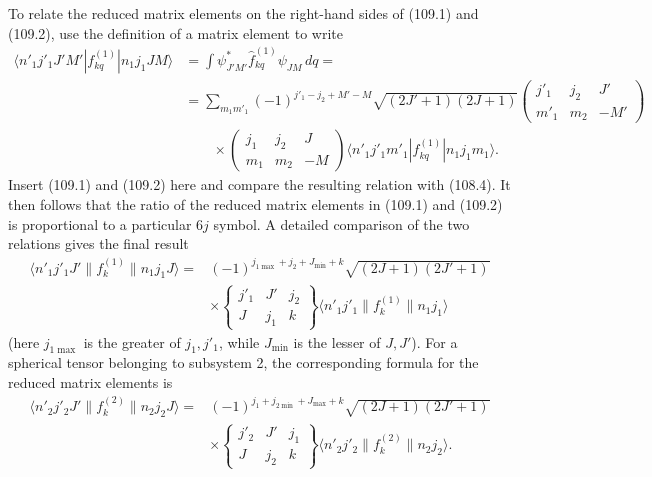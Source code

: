 To relate the reduced matrix elements on the right-hand sides of (109.1) and (109.2), use the definition of a matrix element to write
\[
 \begin{aligned}
 \langle n'_1j'_1J'M'|f_{kq}^{(1)}|n_1j_1JM\rangle
 & =\int\psi_{J'M'}^{*}\widehat f_{kq}^{(1)}\psi_{JM}\,dq={}\\
 & =\sum_{\!m_1m'_1}(-1)^{j'_1-j_2+M'-M}\!\!\!\sqrt{(2J'+1)(2J+1)}
 \begin{pmatrix}j'_1&j_2&J'\\m'_1&m_2&-M'\end{pmatrix}\\
 &\qquad\times
 \begin{pmatrix}j_1&j_2&J\\m_1&m_2&-M\end{pmatrix}
 \langle n'_1j'_1m'_1|f_{kq}^{(1)}|n_1j_1m_1\rangle.
 \end{aligned}
\]
Insert (109.1) and (109.2) here and compare the resulting relation with (108.4). It then follows that the ratio of the reduced matrix elements in (109.1) and (109.2) is proportional to a particular $6j$ symbol. A detailed comparison of the two relations gives the final result
\begin{equation}
 \begin{aligned}
 \langle n'_1j'_1J'\|f_k^{(1)}\|n_1j_1J\rangle
 ={}&(-1)^{j_{1\max}+j_2+J_{\min}+k}
 \sqrt{(2J+1)(2J'+1)}\\
 &\times
 \begin{Bmatrix}j'_1&J'&j_2\\J&j_1&k\end{Bmatrix}
 \langle n'_1j'_1\|f_k^{(1)}\|n_1j_1\rangle
 \end{aligned}
 \tag{109.3}
\end{equation}
(here $j_{1\max}$ is the greater of $j_1,j'_1$, while $J_{\min}$ is the lesser of $J,J'$). For a spherical tensor belonging to subsystem 2, the corresponding formula for the reduced matrix elements is
\begin{equation}
 \begin{aligned}
 \langle n'_2j'_2J'\|f_k^{(2)}\|n_2j_2J\rangle
 ={}&(-1)^{j_1+j_{2\min}+J_{\max}+k}
 \sqrt{(2J+1)(2J'+1)}\\
 &\times
 \begin{Bmatrix}j'_2&J'&j_1\\J&j_2&k\end{Bmatrix}
 \langle n'_2j'_2\|f_k^{(2)}\|n_2j_2\rangle.
 \end{aligned}
 \tag{109.4}
\end{equation}

